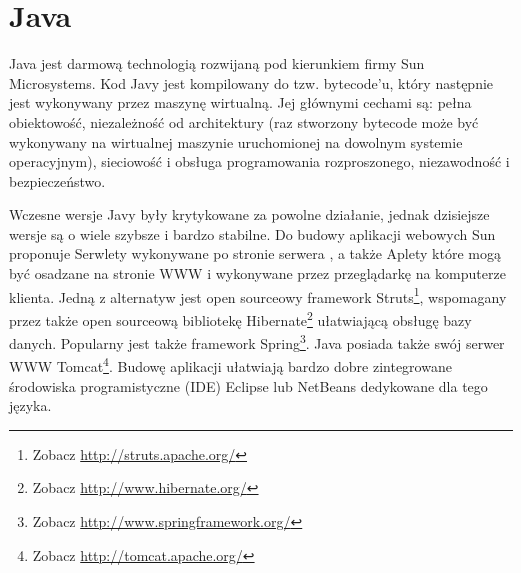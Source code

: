 \documentclass[a4paper,12pt,oneside]{report}
\begin{document}
\section{Java}
\label{sec:java}
Java jest darmową technologią rozwijaną pod kierunkiem firmy Sun Microsystems. Kod Javy jest kompilowany do tzw. bytecode’u, który następnie jest wykonywany przez maszynę wirtualną. Jej głównymi cechami są: pełna obiektowość,  niezależność od architektury (raz stworzony bytecode może być wykonywany na wirtualnej maszynie uruchomionej na dowolnym systemie operacyjnym), sieciowość i obsługa programowania rozproszonego, niezawodność i bezpieczeństwo.

Wczesne wersje Javy były krytykowane za powolne działanie, jednak dzisiejsze wersje są o wiele szybsze i bardzo stabilne. Do budowy aplikacji webowych Sun proponuje Serwlety wykonywane po stronie serwera , a także Aplety które mogą być osadzane na stronie WWW i wykonywane przez przeglądarkę na komputerze klienta. Jedną z alternatyw jest open sourceowy framework Struts\footnote{Zobacz \url{http://struts.apache.org/}}, wspomagany przez także open sourceową bibliotekę Hibernate\footnote{Zobacz \url{http://www.hibernate.org/}} ułatwiającą obsługę bazy danych. Popularny jest także framework Spring\footnote{Zobacz \url{http://www.springframework.org/}}. Java posiada także swój serwer WWW Tomcat\footnote{Zobacz \url{http://tomcat.apache.org/}}. Budowę aplikacji ułatwiają bardzo dobre zintegrowane środowiska programistyczne (IDE) Eclipse lub NetBeans dedykowane dla tego języka.
\end{document}
